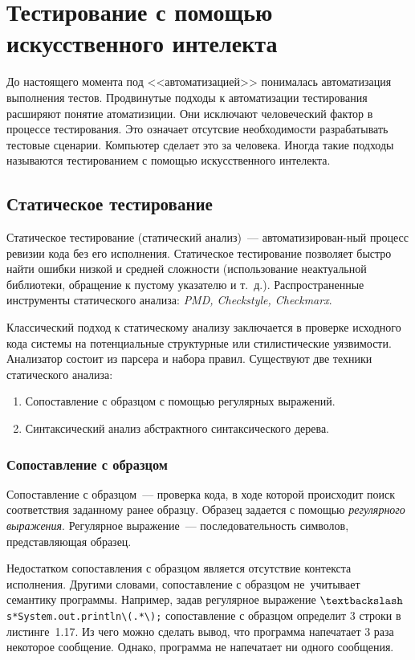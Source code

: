 \section{Тестирование с помощью искусственного интелекта} 

До настоящего момента под <<автоматизацией>> понималась автоматизация выполнения тестов. Продвинутые подходы к автоматизации тестирования расширяют понятие атоматизиции. Они исключают человеческий фактор в процессе тестирования. Это означает отсутсвие необходимости разрабатывать тестовые сценарии. Компьютер сделает это за человека. Иногда такие подходы называются тестированием с помощью искусственного интелекта.

\subsection{Статическое тестирование} 

Статическое тестирование (статический анализ)~--- автоматизирован-ный процесс ревизии кода без его исполнения. Статическое тестирование позволяет быстро найти ошибки низкой и средней сложности (использование неактуальной библиотеки, обращение к пустому указателю и т.~д.). Распространенные инструменты статического анализа: \textit{PMD, Checkstyle, Checkmarx}.

Классический подход к статическому анализу заключается в проверке исходного кода системы на потенциальные структурные или стилистические уязвимости. Анализатор состоит из парсера и набора правил. Существуют две техники статического анализа:


\begin{enumerate}
	\item Сопоставление с образцом с помощью регулярных выражений.
	\item Синтаксический анализ абстрактного синтаксического дерева.
\end{enumerate}


\subsubsection{Сопоставление с образцом}

Сопоставление с образцом~--- проверка кода, в ходе которой происходит поиск соответствия заданному ранее образцу. Образец задается с помощью \textit{регулярного выражения}. Регулярное выражение~--- последовательность символов, представляющая образец.

Недостатком сопоставления с образцом является отсутствие контекста исполнения. Другими словами, сопоставление с образцом не~учитывает семантику программы. Например, задав регулярное выражение \texttt{$\textbackslash$s*System.out.println\textbackslash(.*\textbackslash);} сопоставление с образцом определит 3 строки в листинге~1.17. Из чего можно сделать вывод, что программа напечатает 3 раза некоторое сообщение. Однако, программа не напечатает ни одного сообщения. 

